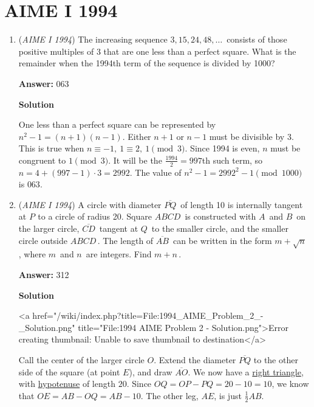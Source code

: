 \section{AIME I 1994}
        \begin{enumerate}
        	\item (\textit{AIME I 1994}) The increasing sequence $3, 15, 24, 48, \ldots\,$ consists of those positive multiples of 3 that are one less than a perfect square.  What is the remainder when the 1994th term of the sequence is divided by 1000?


 
 \textbf{Answer: }063



\textbf{Solution}

One less than a perfect square can be represented by $n^2 - 1 = (n+1)(n-1)$. Either $n+1$ or $n-1$ must be divisible by 3. This is true when $n \equiv -1,\ 1 \equiv 2,\ 1 \pmod{3}$. Since 1994 is even, $n$ must be congruent to $1 \pmod{3}$. It will be the $\frac{1994}{2} = 997$th such term, so $n = 4 + (997-1) \cdot 3 = 2992$. The value of $n^2 - 1 = 2992^2 - 1 \pmod{1000}$ is $\boxed{063}$.

 


	\item (\textit{AIME I 1994}) A circle with diameter $\overline{PQ}\,$ of length 10 is internally tangent at $P^{}_{}$ to a circle of radius 20. Square $ABCD\,$ is constructed with $A\,$ and $B\,$ on the larger circle, $\overline{CD}\,$ tangent at $Q\,$ to the smaller circle, and the smaller circle outside $ABCD\,$. The length of $\overline{AB}\,$ can be written in the form $m + \sqrt{n}\,$, where $m\,$ and $n\,$ are integers. Find $m + n\,$.


 
 \textbf{Answer: }312



\textbf{Solution}

<a href="/wiki/index.php?title=File:1994\_AIME\_Problem\_2\_-\_Solution.png" title="File:1994 AIME Problem 2 - Solution.png">Error creating thumbnail: Unable to save thumbnail to destination</a>

 Call the center of the larger circle $O$. Extend the diameter $\overline{PQ}$ to the other side of the square (at point $E$), and draw $\overline{AO}$. We now have a \href{https://artofproblemsolving.com/wiki/index.php?title=Right\_triangle}{right triangle}, with \href{https://artofproblemsolving.com/wiki/index.php?title=Hypotenuse}{hypotenuse} of length $20$. Since $OQ = OP - PQ = 20 - 10 = 10$, we know that $OE = AB - OQ = AB - 10$. The other leg, $AE$, is just $\frac 12 AB$. 


\end{enumerate}
